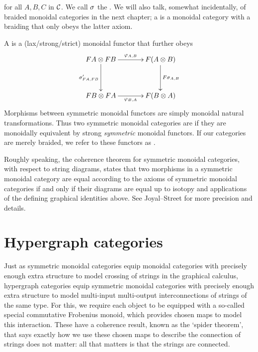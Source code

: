 for all $A,B,C$ in $\mathcal C$.  We call $\sigma$ the . We will also
talk, somewhat incidentally, of braided monoidal categories in the next
chapter; a  is a monoidal category with a
braiding that only obeys the latter axiom.

A  is a
(lax/strong/strict) monoidal functor that further obeys
\[
\xymatrixcolsep{3pc}
\xymatrixrowsep{3pc}
\xymatrix{
FA \ot FB \ar[r]^{\varphi_{A,B}} \ar[d]_{\s'_{FA,FB}} & F(A \ot B)\ar[d]^{F\s_{A,B}}\\
FB \ot FA \ar[r]_{\varphi_{B,A}} & F(B \ot A)
}
\]
Morphisms between symmetric monoidal functors are simply monoidal natural
transformations. Thus two symmetric monoidal categories are  if they are monoidally equivalent by strong
\emph{symmetric} monoidal functors. If our categories are merely braided, we
refer to these functors as .

Roughly speaking, the coherence theorem for symmetric monoidal categories, with
respect to string diagrams, states that two morphisms in a symmetric monoidal
category are equal according to the axioms of symmetric monoidal categories if
and only if their diagrams are equal up to isotopy and applications of the
defining graphical identities above. See Joyal--Street \cite[Theorem
2.3]{JS91} for more precision and details.

\section{Hypergraph categories} \label{sec.hypergraphs}

Just as symmetric monoidal categories equip monoidal categories with precisely
enough extra structure to model crossing of strings in the graphical calculus,
hypergraph categories equip symmetric monoidal categories with precisely enough
extra structure to model multi-input multi-output interconnections of strings of
the same type. For this, we require each object to be equipped with a so-called
special commutative Frobenius monoid, which provides chosen maps to model this
interaction. These have a coherence result, known as the `spider theorem', that
says exactly how we use these chosen maps to describe the connection of strings
does not matter: all that matters is that the strings are connected. 

